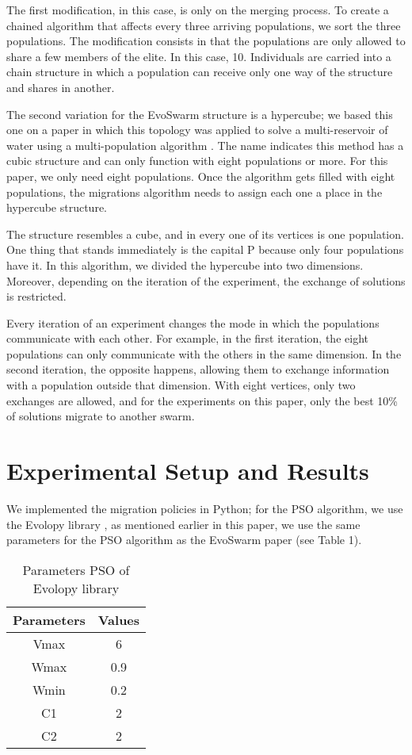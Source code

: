 \documentclass[runningheads]{llncs}
\begin{document}
The first modification, in this case, is only on the merging process. To create
a chained algorithm that affects every three arriving populations, we sort the
three populations. The modification consists in that the populations are only
allowed to share a few members of the elite. In this case, 10. Individuals are
carried into a chain structure in which a population can receive only one way of
the structure and shares in another.

The second variation for the EvoSwarm structure is a hypercube; we based this one
on a paper in which this topology was applied to solve a multi-reservoir of
water using a multi-population algorithm \cite{b20}. The name indicates this
method has a cubic structure and can only function with eight populations or
more. For this paper, we only need eight populations. Once the algorithm gets
filled with eight populations, the migrations algorithm needs to assign each one
a place in the hypercube structure.

The structure resembles a cube, and in every one of its vertices is one
population. One thing that stands immediately is the capital P because only four
populations have it. In this algorithm, we divided the hypercube into two
dimensions. Moreover, depending on the iteration of the experiment, the exchange
of solutions is restricted.

Every iteration of an experiment changes the mode in which the populations
communicate with each other. For example, in the first iteration, the eight
populations can only communicate with the others in the same dimension. In the
second iteration, the opposite happens, allowing them to exchange information
with a population outside that dimension. With eight vertices, only two
exchanges are allowed, and for the experiments on this paper, only the best 10\%
of solutions migrate to another swarm.


\section{Experimental Setup and Results}

We implemented the migration policies in Python; for the PSO algorithm, we use
the Evolopy library \cite{b19}, as mentioned earlier in this paper, we use the
same parameters for the PSO algorithm as the EvoSwarm paper (see Table 1).



\begin{table}[h!]
\centering
\caption{Parameters PSO of Evolopy library}
\begin{tabular}{|c c|} 
 \hline
 Parameters & Values  \\ [0.5ex] 
 \hline\hline
 Vmax & 6 \\ 
 Wmax & 0.9 \\
 Wmin & 0.2 \\
C1 & 2 \\
C2 & 2 \\[0.5ex]
 \hline
\end{tabular}
\label{table:1}
\end{table}
\end{document}
